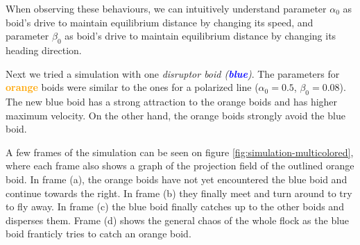 \documentclass[9pt]{pnas-new}
\begin{document}
When observing these behaviours, we can intuitively understand parameter $\alpha_0$ as boid's drive to maintain equilibrium distance by changing its speed, and parameter $\beta_0$ as boid's drive to maintain equilibrium distance by changing its heading direction.

\medskip

Next we tried a simulation with one \textit{disruptor boid (\textcolor{blue}{\textbf{blue}})}.
The parameters for \textcolor{orange}{\textbf{orange}} boids were similar to the ones for a polarized line ($\alpha_0 = 0.5$, $\beta_0 = 0.08$).
The new blue boid has a strong attraction to the orange boids and has higher maximum velocity.
On the other hand, the orange boids strongly avoid the blue boid.

A few frames of the simulation can be seen on figure \ref{fig:simulation-multicolored}, where each frame also shows a graph of the projection field of the outlined orange boid.
In frame (a), the orange boids have not yet encountered the blue boid and continue towards the right.
In frame (b) they finally meet and turn around to try to fly away.
In frame (c) the blue boid finally catches up to the other boids and disperses them.
Frame (d) shows the general chaos of the whole flock as the blue boid franticly tries to catch an orange boid.
\end{document}

